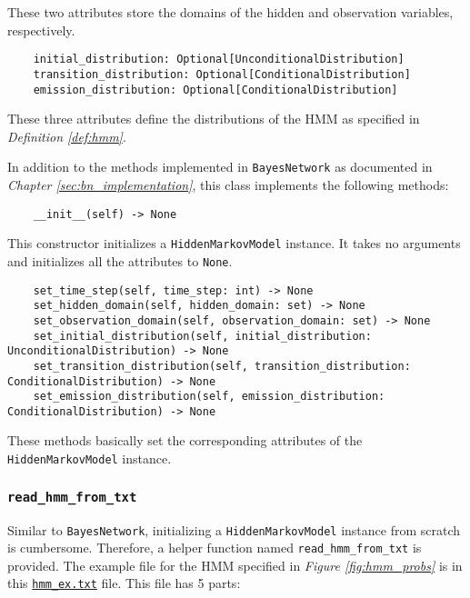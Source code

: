 \documentclass{article}
\theoremstyle{definition}
\begin{document}
These two attributes store the domains of the hidden and observation variables, respectively.

\begin{verbatim}
    initial_distribution: Optional[UnconditionalDistribution]
    transition_distribution: Optional[ConditionalDistribution]
    emission_distribution: Optional[ConditionalDistribution]
\end{verbatim}

These three attributes define the distributions of the HMM as specified in \textit{Definition \ref{def:hmm}}.

In addition to the methods implemented in \texttt{BayesNetwork} as documented in \textit{Chapter \ref{sec:bn_implementation}}, this class implements the following methods:

\begin{verbatim}
    __init__(self) -> None
\end{verbatim}

This constructor initializes a \texttt{HiddenMarkovModel} instance. It takes no arguments and initializes all the attributes to \texttt{None}.

\begin{verbatim}
    set_time_step(self, time_step: int) -> None
    set_hidden_domain(self, hidden_domain: set) -> None
    set_observation_domain(self, observation_domain: set) -> None
    set_initial_distribution(self, initial_distribution: UnconditionalDistribution) -> None
    set_transition_distribution(self, transition_distribution: ConditionalDistribution) -> None
    set_emission_distribution(self, emission_distribution: ConditionalDistribution) -> None
\end{verbatim}

These methods basically set the corresponding attributes of the \texttt{HiddenMarkovModel} instance.

\subsubsection{\texttt{read\_hmm\_from\_txt}}

Similar to \texttt{BayesNetwork}, initializing a \texttt{HiddenMarkovModel} instance from scratch is cumbersome. Therefore, a helper function named \texttt{read\_hmm\_from\_txt} is provided. The example file for the HMM specified in \textit{Figure \ref{fig:hmm_probs}} is in this \href{https://github.com/BullDF/bayes_network/blob/main/hmm_ex.txt}{\texttt{hmm\_ex.txt}} file. This file has 5 parts:
\end{document}
